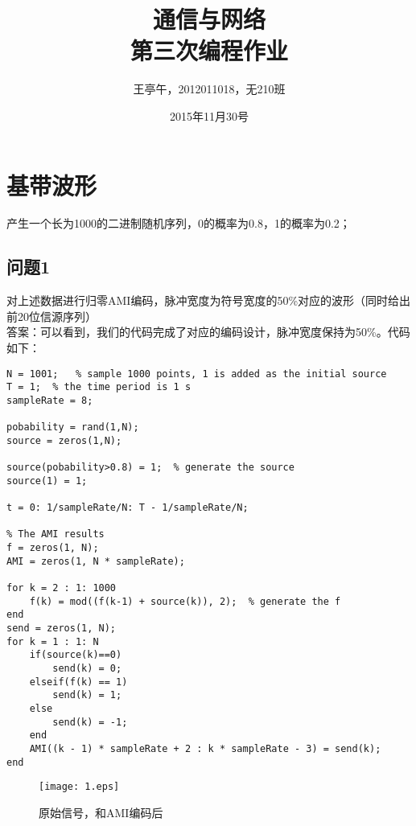 \documentclass{article}
\begin{document}
\title{通信与网络\\第三次编程作业}
\author{王亭午，2012011018，无210班}
\date{2015年11月30号}
\maketitle
\section{基带波形}
产生一个长为1000的二进制随机序列，0的概率为0.8，1的概率为0.2；
\subsection{问题1}对上述数据进行归零AMI编码，脉冲宽度为符号宽度的50\%对应的波形（同时给出前20位信源序列）\\
答案：可以看到，我们的代码完成了对应的编码设计，脉冲宽度保持为50\%。代码如下：
\begin{lstlisting}
N = 1001;   % sample 1000 points, 1 is added as the initial source
T = 1;  % the time period is 1 s
sampleRate = 8;

pobability = rand(1,N);
source = zeros(1,N);

source(pobability>0.8) = 1;  % generate the source
source(1) = 1;

t = 0: 1/sampleRate/N: T - 1/sampleRate/N;

% The AMI results
f = zeros(1, N);
AMI = zeros(1, N * sampleRate);

for k = 2 : 1: 1000
    f(k) = mod((f(k-1) + source(k)), 2);  % generate the f
end
send = zeros(1, N);
for k = 1 : 1: N
    if(source(k)==0)
        send(k) = 0;
    elseif(f(k) == 1)
        send(k) = 1;
    else
        send(k) = -1;
    end
    AMI((k - 1) * sampleRate + 2 : k * sampleRate - 3) = send(k);
end
\end{lstlisting}
\begin{figure}[!htb]
\begin{center}
		\texttt{[image: 1.eps]}
		\caption{原始信号，和AMI编码后}
\end{center}
\end{figure}
\end{document}
